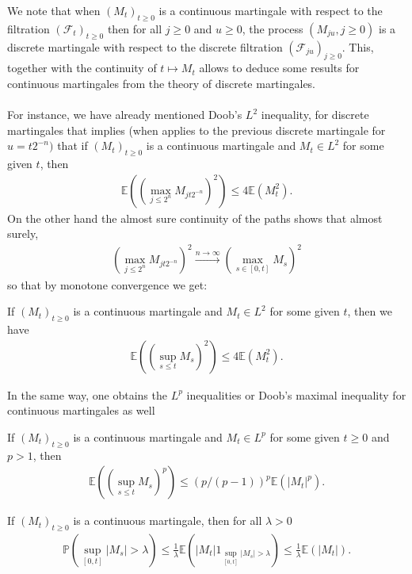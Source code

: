 \documentclass[../mainfile.tex]{subfiles}
\begin{document}
\newpage
We note that when $(M_t)_{t \geq 0}$ is a continuous martingale with respect to the filtration $( \mathcal{F}_t)_{t \geq 0}$ then for all $j \geq 0$ and $u \geq 0$, the process $(M_{ju}, j \geq 0)$ is a discrete martingale with respect to the discrete filtration $( \mathcal{F}_{ju})_{j \geq 0}$. This, together with the continuity of $t \mapsto M_t$ allows to deduce some results for continuous martingales from the theory of discrete martingales. \\
\\
For instance, we have already mentioned Doob's $L^2$ inequality, for discrete martingales that implies (when applies to the previous discrete martingale for $u=t2^{-n})$ that if $(M_t)_{t \geq 0}$ is a continuous martingale and $M_t \in L^2$ for some given $t$, then 
\begin{align*}
\mathbb{E}( (\max_{j \leq 2^n } M_{jt2^{-n}})^2) \leq 4 \mathbb{E}( M_t^2). 
\end{align*}
On the other hand the almost sure continuity of the paths shows that almost surely,  
\begin{align*}
(\max_{j \leq 2^n} M_{jt2^{-n}})^2 \overset{n \to \infty} \longrightarrow ( \max_{s \in [0,t]} M_s)^2 
\end{align*}
so that by monotone convergence we get:
\begin{prop} If $(M_t)_{t \geq 0}$ is a continuous martingale and $M_t \in L^2$ for some given $t$, then we have
\begin{align*}
\mathbb{E}(( \sup_{s \leq t} M_s)^2) \leq 4 \mathbb{E}(M_t^2).
\end{align*}
\end{prop}
In the same way, one obtains the $L^p$ inequalities or Doob's maximal inequality for continuous martingales as well
\begin{prop} If $(M_t)_{t \geq 0}$ is a continuous martingale and $M_t \in L^p$ for some given $t \geq 0$ and $p>1$, then
\begin{align*}
\mathbb{E}(( \sup_{s \leq t} M_s)^p) \leq (p/(p-1))^p \mathbb{E}(| M_t|^p). 
\end{align*}
\end{prop}
\begin{prop} If $(M_t)_{t \geq 0}$ is a continuous martingale, then for all $\lambda >0$
\begin{align*}
 \mathbb{P}( \sup_{[0,t]} |M_s| > \lambda)  \leq \frac{1}{\lambda} \mathbb{E}( |M_t|1_{\sup_{[0,t]}|M_s| > \lambda}) \leq \frac{1}{\lambda} \mathbb{E}( |M_t|). 
\end{align*}
\end{prop}
\newpage
\end{document}
